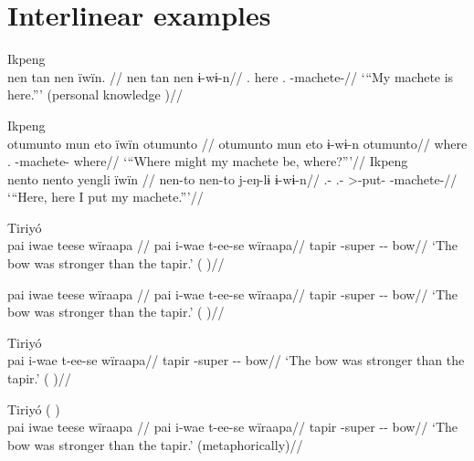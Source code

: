 \documentclass{article}
\begin{document}
\section{Interlinear examples}

\ex  Ikpeng  \\\label{ekiri-13}
\begingl \glpreamble nen tan nen ïwïn. //
\gla nen tan nen ɨ-wɨ-n//
\glb {}. here . -machete-//
\glft ‘“My machete is here.”’ (personal knowledge
)//
\endgl
\xe

\pex\label{}    \a Ikpeng\\
    \label{ekiri-9}        \begingl
        \glpreamble otumunto mun eto ïwïn otumunto //
        \gla otumunto mun eto ɨ-wɨ-n otumunto//
        \glb where .  -machete- where//
            \glft ‘“Where might my machete be, where?”’//  
        \endgl 
    \a Ikpeng\\
    \label{ekiri-10}        \begingl
        \glpreamble nento nento yengli ïwïn //
        \gla nen-to nen-to j-eŋ-lɨ ɨ-wɨ-n//
        \glb {}.- .- >-put- -machete-//
            \glft ‘“Here, here I put my machete.”’//  
        \endgl 
\xe

\ex  Tiriyó  \\\label{tri-1}
\begingl \glpreamble pai iwae teese wïraapa //
\gla pai i-wae t-ee-se wïraapa//
\glb tapir -super -- bow//
\glft ‘The bow was stronger than the tapir.’ (\cite[420]{triomeira1999}
)//
\endgl
\xe

\ex \label{tri-1}
\begingl \glpreamble pai iwae teese wïraapa //
\gla pai i-wae t-ee-se wïraapa//
\glb tapir -super -- bow//
\glft ‘The bow was stronger than the tapir.’ (\cite[420]{triomeira1999}
)//
\endgl
\xe

\ex  Tiriyó  \\\label{tri-1}
\begingl 
\gla pai i-wae t-ee-se wïraapa//
\glb tapir -super -- bow//
\glft ‘The bow was stronger than the tapir.’ (\cite[420]{triomeira1999}
)//
\endgl
\xe

\ex  Tiriyó (\cite[420]{triomeira1999}
) \\\label{tri-1}
\begingl \glpreamble pai iwae teese wïraapa //
\gla pai i-wae t-ee-se wïraapa//
\glb tapir -super -- bow//
\glft ‘The bow was stronger than the tapir.’ (metaphorically)//
\endgl
\xe
\end{document}
